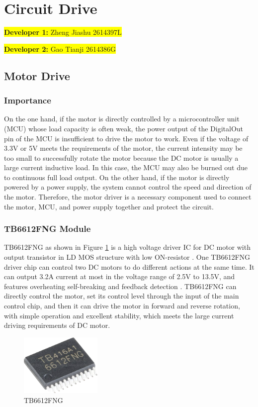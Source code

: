 \documentclass[12pt, a4paper, oneside]{report}
\begin{document}
\section{Circuit Drive}\label{sec:CD}
\colorbox{yellow}{\textbf{Developer 1:} Zheng Jiashu 2614397L}

\colorbox{yellow}{\textbf{Developer 2:} Gao Tianji 2614386G}

\subsection{Motor Drive}
\subsubsection{Importance}
On the one hand, if the motor is directly controlled by a microcontroller unit (MCU) whose load capacity is often weak, the power output of the DigitalOut pin of the MCU is insufficient to drive the motor to work. Even if the voltage of 3.3V or 5V meets the requirements of the motor, the current intensity may be too small to successfully rotate the motor because the DC motor is usually a large current inductive load. In this case, the MCU may also be burned out due to continuous full load output. On the other hand, if the motor is directly powered by a power supply, the system cannot control the speed and direction of the motor. Therefore, the motor driver is a necessary component used to connect the motor, MCU, and power supply together and protect the circuit.

\subsubsection{TB6612FNG Module}
TB6612FNG as shown in Figure \ref{fig:mt1} is a high voltage driver IC for DC motor with output transistor in LD MOS structure with low ON-resistor \cite{zzs1}. One TB6612FNG driver chip can control two DC motors to do different actions at the same time. It can output 3.2A current at most in the voltage range of 2.5V to 13.5V, and features overheating self-breaking and feedback detection \cite{zzs1}. TB6612FNG can directly control the motor, set its control level through the input of the main control chip, and then it can drive the motor in forward and reverse rotation, with simple operation and excellent stability, which meets the large current driving requirements of DC motor. 

\begin{figure}[H]
  \centering
  \includegraphics[width=0.35\textwidth]{pic/Motor Drive/1.png}
  \caption{TB6612FNG \cite{zzs1}}
  \label{fig:mt1}
\end{figure}
\end{document}
